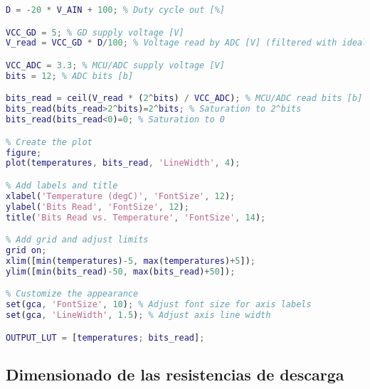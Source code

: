 \begin{lstlisting}[language=Matlab, basicstyle=\ttfamily\small, breaklines=true, frame=single]
D = -20 * V_AIN + 100; % Duty cycle out [%]

VCC_GD = 5; % GD supply voltage [V]
V_read = VCC_GD * D/100; % Voltage read by ADC [V] (filtered with ideal RC)

VCC_ADC = 3.3; % MCU/ADC supply voltage [V]
bits = 12; % ADC bits [b]

bits_read = ceil(V_read * (2^bits) / VCC_ADC); % MCU/ADC read bits [b]
bits_read(bits_read>2^bits)=2^bits; % Saturation to 2^bits
bits_read(bits_read<0)=0; % Saturation to 0

% Create the plot
figure;
plot(temperatures, bits_read, 'LineWidth', 4);

% Add labels and title
xlabel('Temperature (degC)', 'FontSize', 12);
ylabel('Bits Read', 'FontSize', 12);
title('Bits Read vs. Temperature', 'FontSize', 14);

% Add grid and adjust limits
grid on;
xlim([min(temperatures)-5, max(temperatures)+5]);
ylim([min(bits_read)-50, max(bits_read)+50]);

% Customize the appearance
set(gca, 'FontSize', 10); % Adjust font size for axis labels
set(gca, 'LineWidth', 1.5); % Adjust axis line width

OUTPUT_LUT = [temperatures; bits_read];

\end{lstlisting}

\subsection{Dimensionado de las resistencias de descarga}

